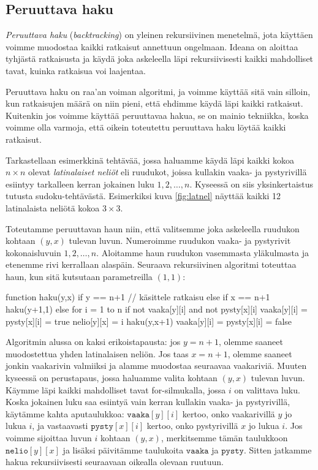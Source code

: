 \subsection{Peruuttava haku}


\emph{Peruuttava haku} (\emph{backtracking}) on yleinen rekursiivinen menetelmä,
jota käyttäen voimme muodostaa kaikki ratkaisut
annettuun ongelmaan.
Ideana on aloittaa tyhjästä ratkaisusta ja käydä
joka askeleella läpi rekursiivisesti kaikki mahdolliset tavat,
kuinka ratkaisua voi laajentaa.

Peruuttava haku on raa'an voiman algoritmi,
ja voimme käyttää sitä vain silloin,
kun ratkaisujen määrä on niin pieni,
että ehdimme käydä läpi kaikki ratkaisut.
Kuitenkin jos voimme käyttää peruuttavaa hakua,
se on mainio tekniikka,
koska voimme olla varmoja, että oikein toteutettu
peruuttava haku löytää kaikki ratkaisut.


Tarkastellaan esimerkkinä tehtävää, jossa haluamme käydä läpi
kaikki kokoa $n \times n$ olevat \emph{latinalaiset neliöt}
eli ruudukot, joissa kullakin vaaka- ja pystyrivillä
esiintyy tarkalleen kerran jokainen luku $1,2,\dots,n$.
Kyseessä on siis yksinkertaistus tutusta sudoku-tehtävästä.
Esimerkiksi kuva \ref{fig:latnel} näyttää kaikki 12 latinalaista neliötä kokoa $3 \times 3$.

Toteutamme peruuttavan haun niin, että valitsemme joka askeleella
ruudukon kohtaan $(y,x)$ tulevan luvun.
Numeroimme ruudukon vaaka- ja pystyrivit kokonaisluvuin $1,2,\dots,n$.
Aloitamme haun ruudukon vasemmasta yläkul\-masta ja etenemme
rivi kerrallaan alaspäin.
Seuraava rekursiivinen algoritmi toteuttaa haun,
kun sitä kutsutaan parametreilla $(1,1)$:

\begin{code}
function haku(y,x)
    if y == n+1
        // käsittele ratkaisu
    else if x == n+1
        haku(y+1,1)
    else
        for i = 1 to n
            if not vaaka[y][i] and not pysty[x][i]
                vaaka[y][i] = pysty[x][i] = true
                nelio[y][x] = i
                haku(y,x+1)
                vaaka[y][i] = pysty[x][i] = false
\end{code}

Algoritmin alussa on kaksi erikoistapausta:
jos $y=n+1$, olemme saaneet muodostettua
yhden latinalaisen neliön.
Jos taas $x=n+1$, olemme saaneet jonkin vaakarivin
valmiiksi ja alamme muodostaa seuraavaa vaakariviä.
Muuten kyseessä on perustapaus, jossa haluamme
valita kohtaan $(y,x)$ tulevan luvun.
Käymme läpi kaikki mahdolliset tavat for-silmukalla,
jossa $i$ on valittava luku.
Koska jokainen luku saa esiintyä vain kerran kullakin
vaaka- ja pystyrivillä, käytämme kahta aputaulukkoa:
$\texttt{vaaka}[y][i]$ kertoo, onko vaakarivillä $y$
jo lukua $i$, ja vastaavasti $\texttt{pysty}[x][i]$ kertoo,
onko pystyrivillä $x$ jo lukua $i$.
Jos voimme sijoittaa luvun $i$ kohtaan $(y,x)$,
merkitsemme tämän taulukkoon $\texttt{nelio}[y][x]$
ja lisäksi päivitämme taulukoita $\texttt{vaaka}$ ja $\texttt{pysty}$.
Sitten jatkamme hakua rekursiivisesti seuraavaan
oikealla olevaan ruutuun.

